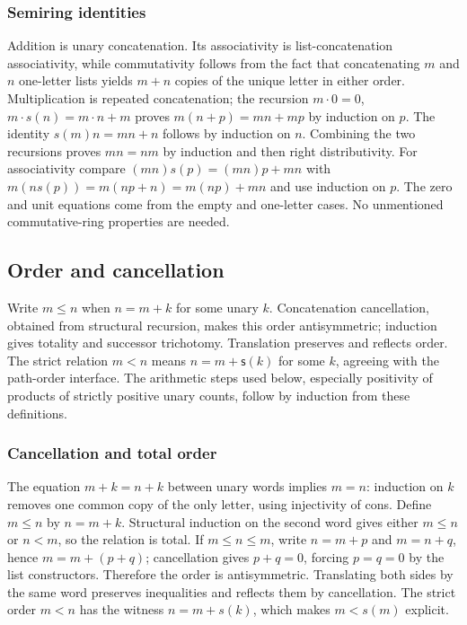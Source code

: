 \documentclass[11pt,reqno]{amsart}
\theoremstyle{definition}\newtheorem{definition}[theorem]{Definition}
\theoremstyle{remark}\newtheorem{remark}[theorem]{Remark}
\begin{document}
\subsubsection*{Semiring identities}\label{supp:4-2}
Addition is unary concatenation. Its associativity is list-concatenation associativity, while commutativity follows from the fact that concatenating $m$ and $n$ one-letter lists yields $m+n$ copies of the unique letter in either order. Multiplication is repeated concatenation; the recursion $m\cdot0=0$, $m\cdot s(n)=m\cdot n+m$ proves $m(n+p)=mn+mp$ by induction on $p$. The identity $s(m)n=mn+n$ follows by induction on $n$. Combining the two recursions proves $mn=nm$ by induction and then right distributivity. For associativity compare $(mn)s(p)=(mn)p+mn$ with $m(ns(p))=m(np+n)=m(np)+mn$ and use induction on $p$. The zero and unit equations come from the empty and one-letter cases. No unmentioned commutative-ring properties are needed.
\medskip

\subsection{Order and cancellation}\label{main:sub-08}
Write $m\le n$ when $n=m+k$ for some unary $k$. Concatenation cancellation, obtained from structural recursion, makes this order antisymmetric; induction gives totality and successor trichotomy. Translation preserves and reflects order. The strict relation $m<n$ means $n=m+\mathsf{s}(k)$ for some $k$, agreeing with the path-order interface. The arithmetic steps used below, especially positivity of products of strictly positive unary counts, follow by induction from these definitions.


\medskip
\subsubsection*{Cancellation and total order}\label{supp:4-3}
The equation $m+k=n+k$ between unary words implies $m=n$: induction on $k$ removes one common copy of the only letter, using injectivity of cons. Define $m\le n$ by $n=m+k$. Structural induction on the second word gives either $m\le n$ or $n<m$, so the relation is total. If $m\le n\le m$, write $n=m+p$ and $m=n+q$, hence $m=m+(p+q)$; cancellation gives $p+q=0$, forcing $p=q=0$ by the list constructors. Therefore the order is antisymmetric. Translating both sides by the same word preserves inequalities and reflects them by cancellation. The strict order $m<n$ has the witness $n=m+s(k)$, which makes $m<s(m)$ explicit.
\medskip
\end{document}
